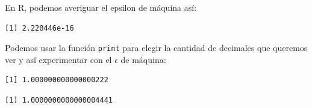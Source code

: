 \documentclass[]{book}
\newenvironment{Shaded}{\begin{snugshade}}{\end{snugshade}}
\newcommand{\DataTypeTok}[1]{\textcolor[rgb]{0.13,0.29,0.53}{#1}}
\newcommand{\DecValTok}[1]{\textcolor[rgb]{0.00,0.00,0.81}{#1}}
\newcommand{\KeywordTok}[1]{\textcolor[rgb]{0.13,0.29,0.53}{\textbf{#1}}}
\newcommand{\NormalTok}[1]{#1}
\newcommand{\OperatorTok}[1]{\textcolor[rgb]{0.81,0.36,0.00}{\textbf{#1}}}
\newcommand{\StringTok}[1]{\textcolor[rgb]{0.31,0.60,0.02}{#1}}
\begin{document}
En R, podemos averiguar el epsilon de máquina así:

\begin{Shaded}
\end{Shaded}

\begin{verbatim}
[1] 2.220446e-16
\end{verbatim}

Podemos usar la función \texttt{print} para elegir la cantidad de decimales que queremos ver y así experimentar con el \(\epsilon\) de máquina:

\begin{Shaded}
\end{Shaded}

\begin{verbatim}
[1] 1.000000000000000222
\end{verbatim}

\begin{Shaded}
\end{Shaded}

\begin{verbatim}
[1] 1.0000000000000004441
\end{verbatim}

\begin{Shaded}
\end{Shaded}
\end{document}
